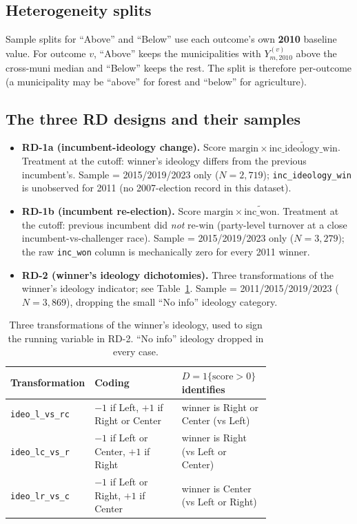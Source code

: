 \documentclass[11pt]{article}
\begin{document}
\subsection{Heterogeneity splits}

Sample splits for ``Above'' and ``Below'' use each outcome's own
\textbf{2010} baseline value. For outcome $v$, ``Above'' keeps the
municipalities with $Y_{m,2010}^{(v)}$ above the cross-muni median and
``Below'' keeps the rest. The split is therefore per-outcome (a
municipality may be ``above'' for forest and ``below'' for
agriculture).

\subsection{The three RD designs and their samples}

\begin{itemize}
\item \textbf{RD-1a (incumbent-ideology change).} Score
  $\text{margin} \times \widetilde{\text{inc\_ideology\_win}}$.
  Treatment at the cutoff: winner's ideology differs from the previous
  incumbent's. Sample = 2015/2019/2023 only
  ($N=2,719$); \texttt{inc\_ideology\_win} is unobserved for
  2011 (no 2007-election record in this dataset).
\item \textbf{RD-1b (incumbent re-election).} Score
  $\text{margin} \times \widetilde{\text{inc\_won}}$.
  Treatment at the cutoff: previous incumbent did \emph{not} re-win
  (party-level turnover at a close incumbent-vs-challenger race).
  Sample = 2015/2019/2023 only ($N=3,279$); the raw
  \texttt{inc\_won} column is mechanically zero for every 2011
  winner.
\item \textbf{RD-2 (winner's ideology dichotomies).} Three
  transformations of the winner's ideology indicator; see
  Table~\ref{tab:ideo_transforms}. Sample =
  2011/2015/2019/2023 ($N=3,869$), dropping the small ``No info''
  ideology category.
\end{itemize}

\begin{table}[H]
\centering
\small
\caption{Three transformations of the winner's ideology, used to sign
the running variable in RD-2. ``No info'' ideology dropped in every
case.}
\label{tab:ideo_transforms}
\begin{tabular}{l p{0.40\linewidth} p{0.35\linewidth}}
\toprule
Transformation & Coding & $D=1\{\text{score}>0\}$ identifies \\
\midrule
\texttt{ideo\_l\_vs\_rc} & $-1$ if Left, $+1$ if Right or Center
                          & winner is Right or Center (vs Left) \\
\addlinespace[1pt]
\texttt{ideo\_lc\_vs\_r} & $-1$ if Left or Center, $+1$ if Right
                          & winner is Right (vs Left or Center) \\
\addlinespace[1pt]
\texttt{ideo\_lr\_vs\_c} & $-1$ if Left or Right, $+1$ if Center
                          & winner is Center (vs Left or Right) \\
\bottomrule
\end{tabular}
\end{table}
\end{document}
